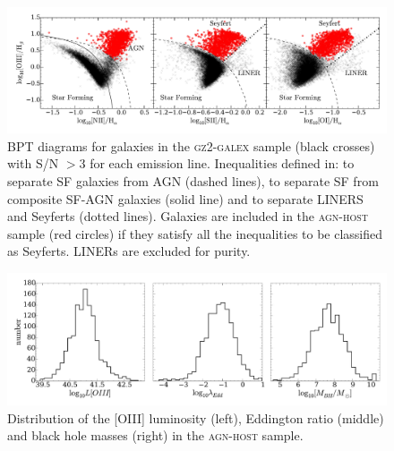 \begin{figure}
\includegraphics[width=\textwidth]{agn/fig2.pdf}
\caption[BPT diagram used to select AGN host galaxies]{BPT diagrams for galaxies in the \textsc{gz2-galex} sample (black crosses) with S/N $> 3$ for each emission line. Inequalities defined in: \protect\cite{kewley01} to separate SF galaxies from AGN (dashed lines), \protect\cite{kauffmann03b} to separate SF from composite SF-AGN galaxies (solid line) and \protect\cite{kewley06} to separate LINERS and Seyferts (dotted lines).  Galaxies are included in the \textsc{agn-host} sample (red circles) if they satisfy all the inequalities to be classified as Seyferts. LINERs are excluded for purity.}
\label{bpt}
\end{figure}

\begin{figure}
\includegraphics[width=\textwidth]{agn/agn-host_distributions_loiii_edd_ratio_mbh.pdf}
\caption[Distribution of measured galaxy parameters in the \textsc{agn-host} sample]{Distribution of the [OIII] luminosity (left), Eddington ratio (middle) and black hole masses (right) in the \textsc{agn-host} sample.}
\label{fig:agndistributions}
\end{figure}



